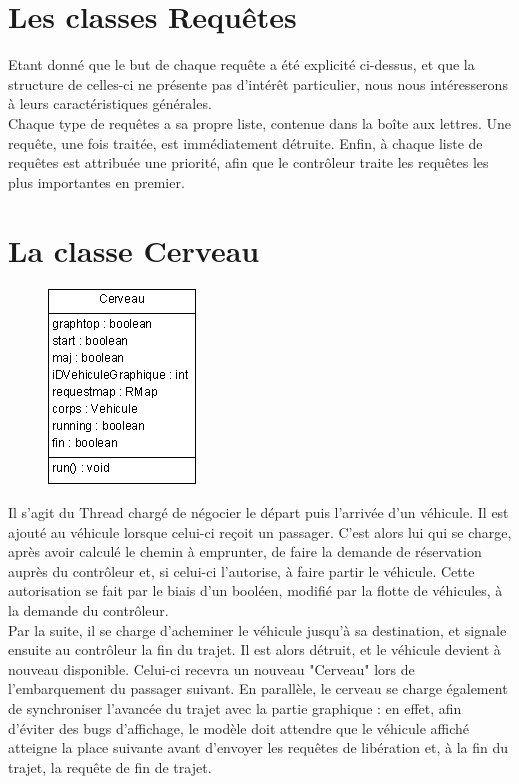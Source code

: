 \documentclass[a4paper, titlepage]{report}
\begin{document}
\section{Les classes Requêtes}

Etant donné que le but de chaque requête a été explicité ci-dessus, et que la structure de celles-ci ne présente pas d'intérêt particulier, nous nous intéresserons à leurs caractéristiques générales. \\
Chaque type de requêtes a sa propre liste, contenue dans la boîte aux lettres. Une requête, une fois traitée, est immédiatement détruite. Enfin, à chaque liste de requêtes est attribuée une priorité, afin que le contrôleur traite les requêtes les plus importantes en premier.

\section{La classe Cerveau}
\begin{figure}
\vspace{-0.5cm}
\includegraphics[scale=1]{Images/cerveau.png}
\end{figure}Il s'agit du Thread chargé de négocier le départ puis l'arrivée d'un véhicule. Il est ajouté au véhicule lorsque celui-ci reçoit un passager. C'est alors lui qui se charge, après avoir calculé le chemin à emprunter, de faire la demande de réservation auprès du contrôleur et, si celui-ci l'autorise, à faire partir le véhicule. Cette autorisation se fait par le biais d'un booléen, modifié par la flotte de véhicules, à la demande du contrôleur.\\
Par la suite, il se charge d'acheminer le véhicule jusqu'à sa destination, et signale ensuite au contrôleur la fin du trajet. Il est alors détruit, et le véhicule devient à nouveau disponible. Celui-ci recevra un nouveau "Cerveau" lors de l'embarquement du passager suivant.
\vspace{0.3cm}
En parallèle, le cerveau se charge également de synchroniser l'avancée du trajet avec la partie graphique : en effet, afin d'éviter des bugs d'affichage, le modèle doit attendre que le véhicule affiché atteigne la place suivante avant d'envoyer les requêtes de libération et, à la fin du trajet, la requête de fin de trajet.
\vspace{0.5cm}
\end{document}
